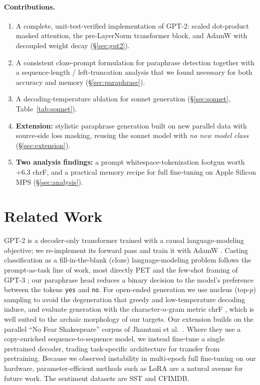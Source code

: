 \documentclass[10pt,twocolumn]{article}
\begin{document}
\paragraph{Contributions.}
\begin{enumerate}
\item A complete, unit-test-verified implementation of GPT-2: scaled
dot-product masked attention, the pre-LayerNorm transformer block, and AdamW
with decoupled weight decay (\S\ref{sec:gpt2}).
\item A consistent cloze-prompt formulation for paraphrase detection together
with a sequence-length / left-truncation analysis that we found necessary for
both accuracy and memory (\S\ref{sec:paraphrase}).
\item A decoding-temperature ablation for sonnet generation
(\S\ref{sec:sonnet}, Table~\ref{tab:sonnet}).
\item \textbf{Extension:} stylistic paraphrase generation built on new parallel
data with source-side loss masking, reusing the sonnet model with \emph{no new
model class} (\S\ref{sec:extension}).
\item \textbf{Two analysis findings:} a prompt whitespace-tokenization footgun
worth $+6.3$ chrF, and a practical memory recipe for full fine-tuning on Apple
Silicon MPS (\S\ref{sec:analysis}).
\end{enumerate}

\section{Related Work}
GPT-2 \cite{radford2019language} is a decoder-only transformer
\cite{vaswani2017attention} trained with a causal language-modeling objective;
we re-implement its forward pass and train it with AdamW
\cite{loshchilov2019decoupled}. Casting classification as a fill-in-the-blank
(cloze) language-modeling problem follows the prompt-as-task line of work, most
directly PET \cite{schick2021exploiting} and the few-shot framing of GPT-3
\cite{brown2020language}; our paraphrase head reduces a binary decision to the
model's preference between the tokens \texttt{yes} and \texttt{no}. For open-ended
generation we use nucleus (top-$p$) sampling \cite{holtzman2020curious} to avoid
the degeneration that greedy and low-temperature decoding induce, and evaluate
generation with the character-$n$-gram metric chrF \cite{popovic2015chrf}, which
is well suited to the archaic morphology of our targets. Our extension builds on
the parallel ``No Fear Shakespeare'' corpus of Jhamtani et
al.~\cite{jhamtani2017shakespearizing}. Where they use a copy-enriched
sequence-to-sequence model, we instead fine-tune a single pretrained
decoder, trading task-specific architecture for transfer from pretraining.
Because we observed instability in multi-epoch full fine-tuning on our hardware,
parameter-efficient methods such as LoRA \cite{hu2022lora} are a natural avenue
for future work. The sentiment datasets are SST \cite{socher2013recursive} and
CFIMDB.
\end{document}
